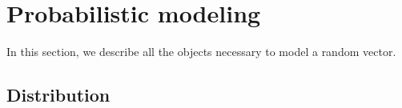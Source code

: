 
\newpage\section{Probabilistic modeling}

In this section, we describe all the objects necessary to model a random vector.

\subsection{Distribution}

